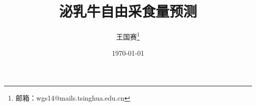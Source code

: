 \documentclass[UTF8,a4paper,10pt, twocolumn]{ctexart}
\title{泌乳牛自由采食量预测}
\author{王国赛\thanks{邮箱：wgs14@mails.tsinghua.edu.cn}}
\date{\today}
\begin{document}
    \maketitle
    \thispagestyle{fancy}













%
%
%

\renewcommand\refname{参考文献}
\small

 
\end{document}
